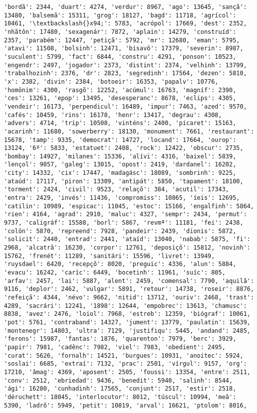 \begin{Verbatim}[commandchars=\\\{\}]
'bordã': 2344, 'duart': 4274, 'verdur': 8967, 'ago': 13645, 'sançã': 13480, 'balsemã': 15311, 'grog': 18127, 'bagd': 11718, 'agrícol': 10461, '\textbackslash{}x94;': 5783, 'acrópol': 17669, 'dest': 2352, 'nhãtôn': 17480, 'sexagenár': 7872, 'aplain': 14279, 'construíd': 2357, 'parabém': 12447, 'petiçã': 5792, 'mr': 12680, 'eman': 5795, 'atavi': 11508, 'bolsinh': 12471, 'bisavô': 17379, 'severin': 8987, 'suculent': 5799, 'fact': 6844, 'constru': 4291, 'ponson': 10523, 'engendr': 2497, 'jogador': 2373, 'distint': 2374, 'velhinh': 13799, 'trabalhozinh': 2376, 'dr': 2823, 'segredinh': 17564, 'dezen': 5810, 'x': 2382, 'divin': 2384, 'botoeir': 16353, 'papalv': 10776, 'homônim': 4300, 'rasgõ': 12252, 'acúmul': 16763, 'magníf': 2390, 'ces': 13261, 'epop': 13495, 'desesperanc': 8678, 'eclips': 4305, 'vendeir': 16173, 'perpendicul': 16489, 'impur': 7463, 'azed': 9570, 'cafés': 10459, 'rins': 16178, 'henr': 13417, 'degrau': 4308, 'advers': 4714, 'trip': 10508, 'vinténs': 2400, 'picaret': 15163, 'acarinh': 11680, 'sowerberry': 18130, 'monument': 7661, 'restaurant': 15678, 'tamp': 9335, 'democrat': 14727, 'locand': 17664, 'ourop': 13124, '6º': 5833, 'estatuet': 2408, 'rock': 12422, 'obscur': 2735, 'bombay': 14927, 'milanes': 15336, 'alívi': 4316, 'baixel': 5839, 'lençol': 9057, 'galeg': 13015, 'opost': 2419, 'dardanel': 16202, 'city': 14332, 'cix': 17447, 'madagásc': 18089, 'sombrinh': 9225, 'ataúd': 17117, 'piron': 13309, 'antipát': 5850, 'tapament': 18100, 'torment': 2424, 'civil': 9523, 'relaçõ': 384, 'acutil': 17343, 'entra': 2429, 'invés': 11436, 'compromiss': 10865, 'íeis': 12695, 'catilin': 10989, 'espicac': 11045, 'estoc': 15166, 'engalfinh': 5864, 'rien': 4164, 'agrad': 2910, 'maluc': 4327, 'sempr': 2434, 'permut': 9737, 'caligráf': 15588, 'borl': 5867, 'revmª': 11181, 'fei': 2438, 'colôn': 5870, 'repreend': 7928, 'pandeir': 2439, 'dionis': 5872, 'solicit': 2440, 'entrad': 2441, 'ataíd': 13040, 'nabab': 5875, 'fi': 2968, 'alcatrã': 16230, 'corpor': 12761, 'deposiçõ': 15812, 'novinh': 15762, 'frenét': 11289, 'sanitári': 15596, 'livret': 13949, 'ruysdael': 6420, 'recepçõ': 8020, 'preguic': 4336, 'alun': 5884, 'evacu': 16242, 'caríc': 6449, 'bocetinh': 11961, 'suíc': 805, 'arfav': 2457, 'lai': 5887, 'alent': 2459, 'comensal': 7790, 'aquilã': 9116, 'deplor': 2462, 'vulgar': 5891, 'retour': 14738, 'roseir': 8876, 'refeiçã': 4344, 'névo': 9662, 'nitid': 13712, 'ouriv': 2468, 'trast': 4289, 'sacrári': 12241, '1898': 12644, 'empobrec': 13613, 'chamusc': 8838, 'avez': 2476, 'loiol': 7968, 'estreb': 12359, 'biógraf': 10061, 'pot': 5761, 'contraband': 14327, 'jument': 13779, 'paulatin': 15639, 'montenegr': 14803, 'ultra': 7129, 'justifiqu': 5445, 'andand': 2485, 'ferons': 15987, 'fantas': 1876, 'quarenton': 7979, 'berc': 3929, 'papir': 7981, 'cadênc': 7982, 'viel': 7983, 'obedient': 2495, 'curat': 5626, 'fornalh': 14521, 'burgues': 10931, 'anoitec': 5924, 'soslai': 6685, 'extraí': 7132, 'prac': 2501, 'vírgul': 9157, 'org': 17210, 'âmag': 4369, 'aposent': 2505, 'foussi': 13354, 'entre': 2511, 'conv': 2512, 'ebriedad': 9436, 'benedit': 5940, 'salinh': 8544, 'ági': 16280, 'cunhadinh': 17565, 'conjunt': 2517, 'estir': 2518, 'déruchett': 18045, 'interlocutor': 8012, 'túscul': 10994, 'meã': 5390, 'ladrõ': 5949, 'petit': 10819, 'arval': 16621, 'ptolom': 8016, 
\end{Verbatim}
